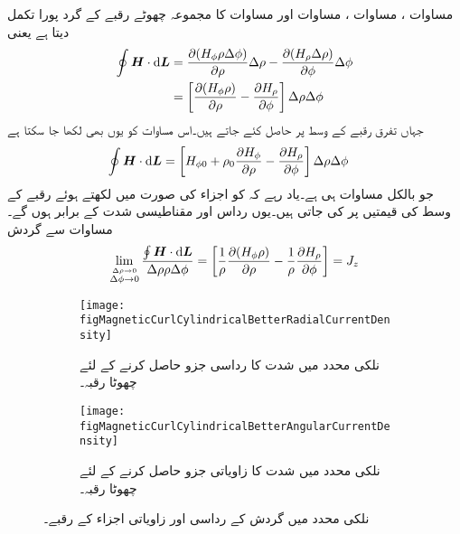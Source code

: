 مساوات ، مساوات ، مساوات  اور مساوات  کا مجموعہ چھوٹے رقبے کے گرد پورا تکمل دیتا ہے یعنی
\begin{gather}
\begin{aligned}\label{مساوات_مقناطیسی_نلکی_پہلا_بند_تکمل_دوبارہ}
\oint \kvec{H} \cdot \dif \kvec{L}&=\frac{\partial (H_{\phi}\rho \Delta \phi)}{\partial \rho}\Delta \rho-\frac{\partial (H_{\rho} \Delta \rho)}{\partial \phi}\Delta \phi\\
&=\left[\frac{\partial (H_{\phi}\rho )}{\partial \rho}-\frac{\partial H_{\rho}}{\partial \phi}\right] \Delta \rho\Delta \phi
\end{aligned}
\end{gather}
جہاں تفرق رقبے کے وسط پر حاصل کئے جاتے ہیں۔اس مساوات کو یوں بھی لکھا جا سکتا ہے
\begin{align*}
\oint \kvec{H} \cdot \dif \kvec{L}&=\left[H_{\phi 0} +\rho_0 \frac{\partial H_{\phi}}{\partial \rho}-\frac{\partial H_{\rho}}{\partial \phi}\right] \Delta \rho\Delta \phi
\end{align*}
جو بالکل مساوات  ہی ہے۔یاد رہے کہ  کو اجزاء کی صورت میں لکھتے ہوئے رقبے کے وسط کی قیمتیں پر کی جاتی ہیں۔یوں رداس   اور مقناطیسی شدت  کے برابر ہوں گے۔مساوات  سے گردش
\begin{align}\label{مساوات_مقناطیسی_رداسی_ذ_گردش}
\lim_{\overset{\Delta \rho \to 0}{\Delta \phi \to 0}} \frac{\oint \kvec{H} \cdot \dif \kvec{L}}{\Delta \rho \rho \Delta \phi}=\left[\frac{1}{\rho}\frac{\partial (H_{\phi}\rho )}{\partial \rho}-\frac{1}{\rho}\frac{\partial H_{\rho}}{\partial \phi}\right] =J_z
\end{align}

\begin{figure}
\centering
\begin{subfigure}{0.5\textwidth}
\centering
\texttt{[image: figMagneticCurlCylindricalBetterRadialCurrentDensity]}
\caption{نلکی محدد میں شدت کا رداسی جزو حاصل کرنے کے لئے چھوٹا رقبہ۔}
\end{subfigure}%
%
\begin{subfigure}{0.5\textwidth}
\centering
\texttt{[image: figMagneticCurlCylindricalBetterAngularCurrentDensity]}
\caption{نلکی محدد میں شدت کا زاویاتی جزو حاصل کرنے کے لئے چھوٹا رقبہ۔}
\end{subfigure}%
\caption{نلکی محدد میں گردش کے رداسی اور زاویاتی اجزاء کے رقبے۔}
\label{شکل_مقناطیسی_نلکی_رداسی}
\end{figure}

